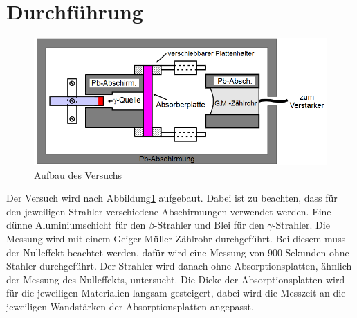 \section{Durchführung}
\label{sec:Durchführung}
\begin{figure}[H]
    \centering
    \includegraphics[width=\textwidth]{content/Aufbau.png}
    \caption{Aufbau des Versuchs}
    \label{fig:mess}
\end{figure}
\noindent
Der Versuch wird nach Abbildung\ref{fig:mess} aufgebaut.
Dabei ist zu beachten, dass für  den jeweiligen Strahler verschiedene Abschirmungen verwendet werden.
Eine dünne Aluminiumschicht für den $\beta$-Strahler und Blei für den $\gamma$-Strahler.
Die Messung wird mit einem Geiger-Müller-Zählrohr durchgeführt.
Bei diesem muss der Nulleffekt beachtet werden, dafür wird eine Messung von 900 Sekunden ohne Stahler durchgeführt.
Der Strahler wird danach ohne Absorptionsplatten, ähnlich der Messung des Nulleffekts, untersucht.
Die Dicke der Absorptionsplatten wird für die jeweiligen Materialien langsam gesteigert, dabei wird die Messzeit an die jeweiligen Wandstärken der Absorptionsplatten angepasst.
